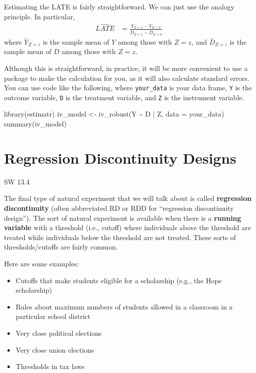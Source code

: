 \documentclass[
  letterpaper,
  DIV=11,
  numbers=noendperiod]{scrreprt}
\newenvironment{Shaded}{\begin{snugshade}}{\end{snugshade}}
\newcommand{\AttributeTok}[1]{\textcolor[rgb]{0.40,0.45,0.13}{#1}}
\newcommand{\FunctionTok}[1]{\textcolor[rgb]{0.28,0.35,0.67}{#1}}
\newcommand{\NormalTok}[1]{\textcolor[rgb]{0.00,0.23,0.31}{#1}}
\newcommand{\OtherTok}[1]{\textcolor[rgb]{0.00,0.23,0.31}{#1}}
\newcommand{\SpecialCharTok}[1]{\textcolor[rgb]{0.37,0.37,0.37}{#1}}
\begin{document}
Estimating the LATE is fairly straightforward. We can just use the
analogy principle. In particular, \begin{align*}
  \widehat{LATE} &= \frac{\bar{Y}_{Z=1} - \bar{Y}_{Z=0}}{\bar{D}_{Z=1} - \bar{D}_{Z=0}}
\end{align*} where \(\bar{Y}_{Z=z}\) is the sample mean of \(Y\) among
those with \(Z=z\), and \(\bar{D}_{Z=z}\) is the sample mean of \(D\)
among those with \(Z=z\).

Although this is straightforward, in practice, it will be more
convenient to use a package to make the calculation for you, as it will
also calculate standard errors. You can use code like the following,
where \texttt{your\_data} is your data frame, \texttt{Y} is the outcome
variable, \texttt{D} is the treatment variable, and \texttt{Z} is the
instrument variable.

\begin{Shaded}
\begin{Highlighting}[]
\FunctionTok{library}\NormalTok{(estimatr)}
\NormalTok{iv\_model }\OtherTok{\textless{}{-}} \FunctionTok{iv\_robust}\NormalTok{(Y }\SpecialCharTok{\textasciitilde{}}\NormalTok{ D }\SpecialCharTok{|}\NormalTok{ Z, }\AttributeTok{data =}\NormalTok{ your\_data)}
\FunctionTok{summary}\NormalTok{(iv\_model)}
\end{Highlighting}
\end{Shaded}

\section{Regression Discontinuity
Designs}\label{regression-discontinuity-designs}

SW 13.4

The final type of natural experiment that we will talk about is called
\textbf{regression discontinuity} (often abbreviated RD or RDD for
``regression discontinuity design''). The sort of natural experiment is
available when there is a \textbf{running variable} with a threshold
(i.e., cutoff) where individuals above the threshold are treated while
individuals below the threshold are not treated. These sorts of
thresholds/cutoffs are fairly common.

Here are some examples:

\begin{itemize}
\item
  Cutoffs that make students eligible for a scholarship (e.g., the Hope
  scholarship)
\item
  Rules about maximum numbers of students allowed in a classroom in a
  particular school district
\item
  Very close political elections
\item
  Very close union elections
\item
  Thresholds in tax laws
\end{itemize}
\end{document}
